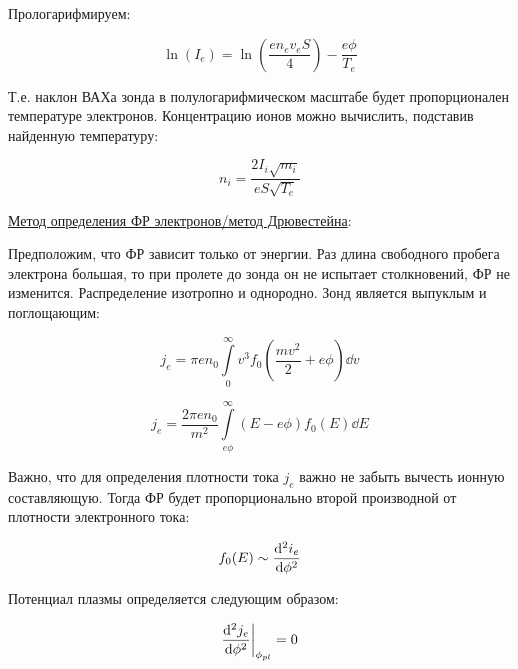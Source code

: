 \documentclass[10pt, a4paper]{article}
\begin{document}
Прологарифмируем:

\begin{equation*}
	\ln(I_e) = \ln(\frac{en_ev_eS}{4})-\frac{e\phi}{T_e}
\end{equation*}

Т.е. наклон ВАХа зонда в полулогарифмическом масштабе будет пропорционален температуре электронов. Концентрацию ионов можно вычислить, подставив найденную температуру:

\begin{equation*}
	n_i = \frac{2I_i\sqrt{m_i}}{eS\sqrt{T_e}}
\end{equation*}

\uline{Метод определения ФР электронов/метод Дрювестейна}:

Предположим, что ФР зависит только от энергии. Раз длина свободного пробега электрона большая, то при пролете до зонда он не испытает столкновений, ФР не изменится. Распределение изотропно и однородно. Зонд является выпуклым и поглощающим:

\begin{equation*}
	j_e = \pi e n_0 \int\limits_0^\infty v^3 f_0 \left(\frac{mv^2}{2} + e\phi\right) \dd{v}
\end{equation*}

\begin{equation*}
	j_e = \frac{2\pi e n_0}{m^2} \int\limits_{e\phi}^\infty(E-e\phi) f_0(E)\dd{E}
\end{equation*}

Важно, что для определения плотности тока $j_e$ важно не забыть вычесть ионную составляющую. Тогда ФР будет пропорционально второй производной от плотности электронного тока:

\begin{equation*}
	f_0(E)\sim\dv[2]{i_e}{\phi}
\end{equation*}

Потенциал плазмы определяется следующим образом:

\begin{equation*}
	\dv[2]{j_e}{\phi}\bigg|_{\phi_{pl}} = 0
\end{equation*}

%
%
%
%
%
%
%
\end{document}
